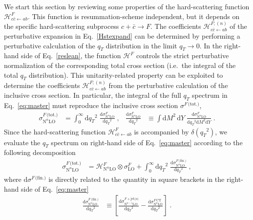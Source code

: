 \documentclass[12pt]{article}
\DeclareRobustCommand{\qt}{\ensuremath{q_T}\xspace}
\DeclareRobustCommand{\rd}{\ensuremath{\mathrm{d}}}
\DeclareRobustCommand{\cH}{\ensuremath{\mathcal{H}}}
\DeclareRobustCommand{\jets}{\text{jet(s)}\xspace}
\DeclareRobustCommand{\CT}{\text{CT}\xspace}
\DeclareRobustCommand{\fin}{\text{(fin.)}\xspace}
\DeclareRobustCommand{\tot}{\text{(tot.)}\xspace}
\DeclareRobustCommand{\LO}{\text{LO}\xspace}
\DeclareRobustCommand{\N}[1]{\ensuremath{\text{N}^{#1}}} %
\begin{document}
We start this section by reviewing some properties of the hard-scattering function $\cH_{c{\bar c} \gets ab}^{F}$. 
This function is resummation-scheme independent, but it depends on the specific hard-scattering subprocess $c + {\bar c} \to F$. 
The coefficients $\cH_{c{\bar c} \gets ab}^{F;(n)}$ of the perturbative expansion in Eq.~\eqref{Hstexpand} can be determined by performing a perturbative calculation of the $\qt$ distribution in the limit $\qt \to 0$. 
In the right-hand side of Eq.~\eqref{reslean}, the function $\cH^{F}$ controls the strict perturbative normalization of the corresponding total cross section (i.e.\ the integral of the total $\qt$ distribution). 
This unitarity-related property can be exploited to determine the coefficients $\cH_{c{\bar c} \gets ab}^{F ;(n)}$ from the perturbative calculation of the inclusive cross section.  
In particular, the integral of the full $\qt$ spectrum in Eq.~\eqref{eq:master} must reproduce the inclusive cross section $\sigma^{F\,\tot}$,
\begin{align}
  \sigma^{F\,\tot}_{\N{n}\LO}
  &=
  \int_0^\infty\rd\qt^2 \; \frac{\rd\sigma^{F}_{\N{n}\LO}}{\rd\qt^2} \;, 
  &
  \frac{\rd\sigma^{F}_{\N{n}\LO}}{\rd\qt^2}
  &\equiv
  \int\rd M^2 \, \rd Y \;
  \frac{\rd\sigma^{F}_{\N{n}\LO}}{\rd\qt^2\rd M^2\rd Y} \;.
  \label{restotp}
\end{align}
Since the hard-scattering function $\cH_{c\bar{c}\gets ab}^{F}$ is accompanied by $\delta(\qt^{2})$, we evaluate the $\qt$ spectrum on right-hand side of Eq.~\eqref{eq:master} according to the following decomposition \cite{Bozzi:2005wk}
\begin{align}
  \sigma^{F\,\tot}_{\N{n}\LO}
  &=
  \cH^F_{\N{n}\LO} \otimes \sigma^F_{\LO} + 
  \int_0^\infty\rd\qt^2 \; \frac{\rd\sigma^{F\,\fin}_{\N{n}\LO}}{\rd\qt^2} \;, 
  \label{sigtotrel} 
\end{align}
where $\rd{\sigma}^{F\,\fin}$ is directly related to the quantity in square brackets in the right-hand side of Eq.~\eqref{eq:master}
\begin{align}
  \frac{\rd\sigma^{F\,\fin}_{\N{n}\LO}}{\rd\qt^2}
  &\equiv
  \left[
    \frac{\rd\sigma^{F+\jets}_{\N{n-1}\LO}}{\rd\qt^2} -
    \frac{\rd\sigma^{F\,\CT}_{\N{n}\LO}}{\rd\qt^2} 
  \right]
  \; .
  \label{sigfin}
\end{align}
\end{document}
